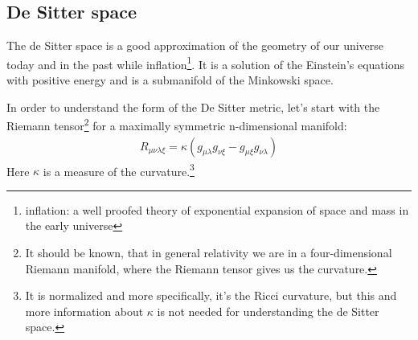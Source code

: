 \subsection{De Sitter space \checkmark} 
	The de Sitter space is a good approximation of the geometry of our universe today and in the past while inflation\footnote{inflation: a well proofed theory of exponential expansion of space and mass in the early universe}. It is a solution of the Einstein's equations with positive energy and is a submanifold of the Minkowski space.
	
	
	In order to understand the form of the De Sitter metric, let's start with the Riemann tensor\footnote{It should be known, that in general relativity we are in a four-dimensional Riemann manifold, where the Riemann tensor gives us the curvature.} for a maximally symmetric n-dimensional manifold: 
		\begin{align}
			R_{\mu \nu \lambda \xi} = \kappa (g_{\mu \lambda} g_{\nu \xi} - g_{\mu \xi} g_{\nu \lambda})
		\end{align}
	Here $\kappa$ is a measure of the curvature.\footnote{It is normalized and more specifically, it's the Ricci curvature, but this and more information about $\kappa$ is not needed for understanding the de Sitter space.}
	
